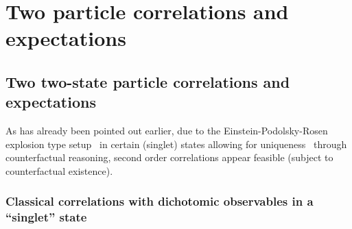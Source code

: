 \chapter{Two particle correlations and expectations}

\section{Two two-state particle correlations and expectations}
\label{2017-b-ch-appe-cts}




As has already been pointed out earlier, due to the Einstein-Podolsky-Rosen explosion type setup~\cite{epr}
in certain (singlet) states allowing for uniqueness~\cite{svozil-2006-uniquenessprinciple,svozil:040102,schimpf-svozil}
through counterfactual reasoning,
second order correlations appear feasible (subject to counterfactual existence).

\subsection{Classical correlations with dichotomic observables in a ``singlet'' state}
\label{2017-b-ch-appe-cts-class}


